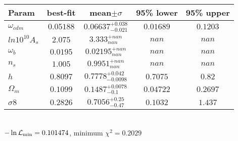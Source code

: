 \begin{tabular}{|l|c|c|c|c|} 
 \hline 
Param & best-fit & mean$\pm\sigma$ & 95\% lower & 95\% upper \\ \hline 
$\omega_{cdm }$ &$0.05188$ & $0.06637_{-0.021}^{+0.038}$ & $0.01689$ & $0.1203$ \\ 
$ln10^{10}A_{s }$ &$2.075$ & $3.333_{nan}^{+nan}$ & $nan$ & $nan$ \\ 
$\omega_{b }$ &$0.0195$ & $0.02195_{nan}^{+nan}$ & $nan$ & $nan$ \\ 
$n_{s }$ &$1.005$ & $0.9951_{nan}^{+nan}$ & $nan$ & $nan$ \\ 
$h$ &$0.8097$ & $0.7778_{-0.0098}^{+0.042}$ & $0.7075$ & $0.82$ \\ 
$\Omega_{m }$ &$0.1099$ & $0.1487_{-0.1}^{+0.0078}$ & $0.04722$ & $0.2697$ \\ 
$\sigma8$ &$0.2826$ & $0.7056_{-0.47}^{+0.25}$ & $0.1032$ & $1.437$ \\ 
\hline 
 \end{tabular} \\ 
$-\ln{\cal L}_\mathrm{min} =0.101474$, minimum $\chi^2=0.2029$ \\ 
